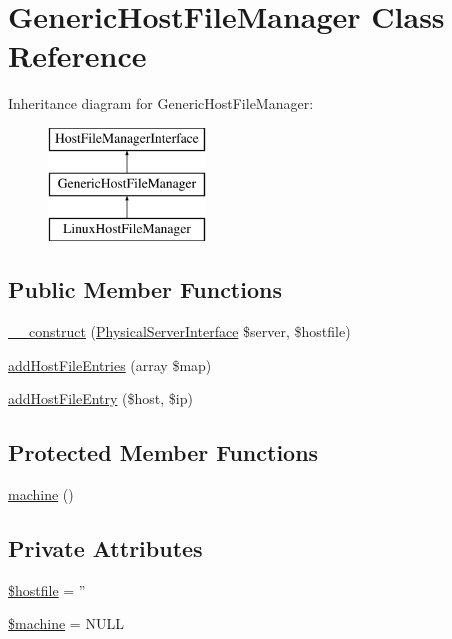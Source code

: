 \hypertarget{classGenericHostFileManager}{\section{Generic\-Host\-File\-Manager Class Reference}
\label{classGenericHostFileManager}
}
Inheritance diagram for Generic\-Host\-File\-Manager\-:\begin{figure}[H]
\begin{center}
\leavevmode
\includegraphics[height=3.000000cm]{classGenericHostFileManager}
\end{center}
\end{figure}
\subsection*{Public Member Functions}
\begin{DoxyCompactItemize}
\item 
\hyperlink{classGenericHostFileManager_a77954cae17f41fb015a0e0d1fff45b43}{\-\_\-\-\_\-construct} (\hyperlink{interfacePhysicalServerInterface}{Physical\-Server\-Interface} \$server, \$hostfile)
\item 
\hyperlink{classGenericHostFileManager_ae01e7b6230f96504368c52c3c4ec3a91}{add\-Host\-File\-Entries} (array \$map)
\item 
\hyperlink{classGenericHostFileManager_a9ccc82beaf9af2d7c71abd54a97ac32c}{add\-Host\-File\-Entry} (\$host, \$ip)
\end{DoxyCompactItemize}
\subsection*{Protected Member Functions}
\begin{DoxyCompactItemize}
\item 
\hyperlink{classGenericHostFileManager_adb396874a075d404a94667ef0a2e9859}{machine} ()
\end{DoxyCompactItemize}
\subsection*{Private Attributes}
\begin{DoxyCompactItemize}
\item 
\hyperlink{classGenericHostFileManager_aa1c75ec37f6a79c0e9c2de867ad09927}{\$hostfile} = ''
\item 
\hyperlink{classGenericHostFileManager_a3c7555c9307dee9fd43dd9b06f6f46a6}{\$machine} = N\-U\-L\-L
\end{DoxyCompactItemize}


